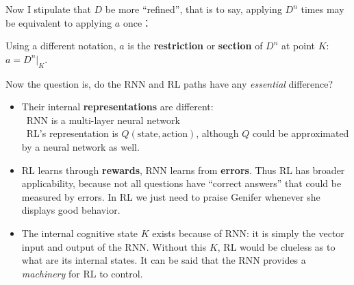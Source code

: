 \documentclass[12pt]{article}
\newcommand{\tab}{\hspace*{1cm}}
\newcommand{\dashh}{\textemdash~}
\begin{document}
Now I stipulate that $D$ be more ``refined'', that is to say, applying $D^n$ times may be equivalent to applying $a$ once：
\begin{figure}[H]
\centering
{}
\end{figure}
Using a different notation, $a$ is the \textbf{restriction} or \textbf{section} of $D^n$ at point $K$: $a = D^n|_K$.

Now the question is, do the RNN and RL paths have any \textit{essential} difference?
\begin{itemize}
\item Their internal \textbf{representations} are different:\\
\dashh RNN is a multi-layer neural network\\
\dashh RL's representation is $Q(\mbox{state},\mbox{action})$, although $Q$ could be approximated by a neural network as well.
\item RL learns through \textbf{rewards}, RNN learns from \textbf{errors}.  Thus RL has broader applicability, because not all questions have ``correct answers'' that could be measured by errors.  In RL we just need to praise Genifer whenever she displays good behavior.
\item The internal cognitive state $K$ exists because of RNN:  it is simply the vector input and output of the RNN.  Without this $K$, RL would be clueless as to what are its internal states.  It can be said that the RNN provides a \textit{machinery} for RL to control.
\end{itemize}


\end{document}
